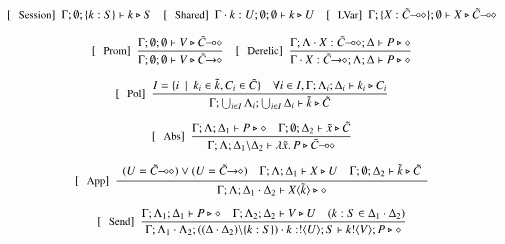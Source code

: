 \begin{figure}[!t]
\[
	\begin{array}{c}
		\trule{Session}~~\Gamma; \emptyset; \set{k:S} \proves k \hastype S 
		\quad
		\trule{Shared}~~\Gamma \cat k : U; \emptyset; \emptyset \proves k \hastype U
		\quad
		\trule{LVar}~~\Gamma; \set{X: \lhot{\tilde{C}}}; \emptyset \proves X \hastype \lhot{\tilde{C}}
		\\[4mm]

		\trule{Prom}~~\tree{
			\Gamma; \emptyset; \emptyset \proves V \hastype \lhot{\tilde{C}}
		}{
			\Gamma; \emptyset; \emptyset \proves V \hastype \shot{\tilde{C}}
		} 
		\quad
		\trule{Derelic}~~\tree{
			\Gamma; \Lambda \cat X : \lhot{\tilde{C}}; \Delta \proves P \hastype \Proc
		}{
			\Gamma \cat X:\shot{\tilde{C}}; \Lambda; \Delta \proves P \hastype \Proc
		}
		\\[6mm]

		\trule{Pol}~~\tree{
			I = \set{i \setbar k_i \in \tilde{k}, C_i \in \tilde{C}}
			\quad
			\forall i \in I, \Gamma; \Lambda_i; \Delta_i \proves k_i \hastype C_i
		}{
			\Gamma; \bigcup_{i \in I} \Lambda_i; \bigcup_{i \in I} \Delta_i \proves \tilde{k} \hastype \tilde{C}
		}
		\\[6mm]

		\trule{Abs}~~\tree{
			\Gamma; \Lambda; \Delta_1 \proves P \hastype \Proc
			\quad
			\Gamma; \es; \Delta_2 \proves \tilde{x} \hastype \tilde{C}
		}{
			\Gamma; \Lambda; \Delta_1 \backslash \Delta_2 \proves \abs{\tilde{x}}{P} \hastype \lhot{\tilde{C}}
		}
		\\[6mm]

		\trule{App}~~\tree{
			\begin{array}{c}
				(U = \lhot{\tilde{C}}) \lor (U = \shot{\tilde{C}})
				\quad
				\Gamma; \Lambda; \Delta_1 \proves X \hastype U
				\quad
				\Gamma; \es; \Delta_2 \proves \tilde{k} \hastype \tilde{C}
			\end{array}
		}{
			\Gamma; \Lambda; \Delta_1 \cat \Delta_2 \proves \appl{X}{\tilde{k}} \hastype \Proc
		} 
		\\[6mm]


		\trule{Send}~~\tree{
			\Gamma; \Lambda_1; \Delta_1 \proves P \hastype \Proc
			\quad
			\Gamma; \Lambda_2; \Delta_2 \proves V \hastype U
			\quad
			(k:S \in \Delta_1 \cat \Delta_2)
		}{
			\Gamma; \Lambda_1 \cat \Lambda_2; ((\Delta \cat \Delta_2) \backslash \set{k:S}) \cat k:\btout{U} S \proves \bout{k}{V} P \hastype \Proc
		}
		\\[6mm]


\end{array}\]
\end{figure}
